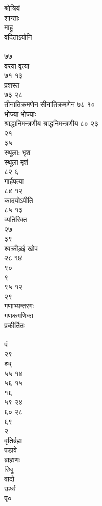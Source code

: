 \documentclass[11pt, openany]{book}
\begin{document}
{{{{{{{{{{{{{{{{{{{{{{{{{{{{{{{{{{{{{{{{{{{{{{{{{{{{{{{{{{{{{{{{{{{{{{{{{{{{{{{{{{{{{{{{{{{{{{{{{{{{{{{{{{{श्रोत्रियं\\
शान्ताः\\
माहू\\
वदिताऽयोनि\\
~\\
७७\\
वरया वृत्या\\
७१ १३\\
प्रशस्त\\
७३ २८\\
तीनातिक्रमणेन सीनातिक्रमणेन ७८ १०\\
भोज्या भोज्याः\\
श्राद्धानिमन्त्रणीय श्राद्धनिमन्त्रणीय ८० २३\\
२१\\
३५\\
स्थूला: भृश\\
स्थूला मृशं\\
८२ ६\\
गार्हपत्या\\
८४ १२\\
कादयोऽपीति\\
८५ १३\\
व्यतिरिक्त\\
२७\\
३९\\
श्वक्रीड़ई खोप\\
૨૮ ૧૪\\
९०\\
९\\
९५ १२\\
२९\\
गणाभ्यन्तरगः\\
गणकगणिका\\
प्रकीर्तितः\\
~\\
पं\\
२९\\
श्थ्\\
५५ १४\\
५६ १५\\
१६\\
५९ २४\\
६० २८\\
६९\\
२\\
वृतिर्ब्रह्म\\
पडावे\\
ब्राह्मणः\\
रिधू\\
वादो\\
ऊर्ध्व\\
पृ०\\
}}}}}}}}}}}}}}}}}}}}}}}}}}}}}}}}}}}}}}}}}}}}}}}}}}}}}}}}}}}}}}}}}}}}}}}}}}}}}}}}}}}}}}}}}}}}}}}}}}}}}}}}}}}
\end{document}
